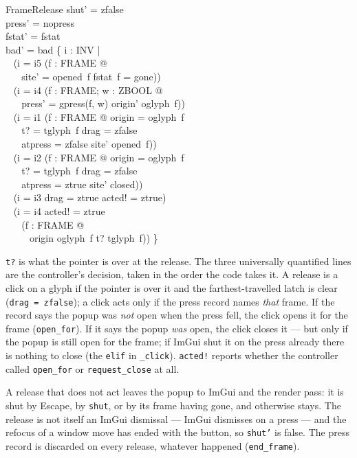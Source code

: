 \documentclass[a4paper,10pt,fleqn]{article}
\begin{document}
\begin{schema}{FrameRelease}
  shut' = zfalse \\
  press' = nopress \\
  fstat' = fstat \\
  bad' = bad \cup \{ i : INV | \\
  \quad~ (i = i5 \land (\exists f : FRAME @ \\
  \quad~ \quad~ site' = opened~f \land fstat~f = gone)) \\
  \quad~ \lor (i = i4 \land (\exists f : FRAME; w : ZBOOL @ \\
  \quad~ \quad~ press' = gpress(f, w) \land origin' \neq oglyph~f)) \\
  \quad~ \lor (i = i1 \land (\exists f : FRAME @ origin = oglyph~f \\
  \quad~ \quad~ \land t? = tglyph~f \land drag = zfalse \\
  \quad~ \quad~ \land atpress = zfalse \land site' \neq opened~f)) \\
  \quad~ \lor (i = i2 \land (\exists f : FRAME @ origin = oglyph~f \\
  \quad~ \quad~ \land t? = tglyph~f \land drag = zfalse \\
  \quad~ \quad~ \land atpress = ztrue \land site' \neq closed)) \\
  \quad~ \lor (i = i3 \land drag = ztrue \land acted! = ztrue) \\
  \quad~ \lor (i = i4 \land acted! = ztrue \\
  \quad~ \quad~ \land (\forall f : FRAME @ \\
  \quad~ \quad~ \quad~ origin \neq oglyph~f \lor t? \neq tglyph~f)) \}
\end{schema}

\texttt{t?} is what the pointer is over at the release.  The three universally
quantified lines are the controller's decision, taken in the order the code
takes it.  A release is a click on a glyph if the pointer is over it and the
farthest-travelled latch is clear (\texttt{drag~=~zfalse}); a click acts only
if the press record names \emph{that} frame.  If the record says the popup was
\emph{not} open when the press fell, the click opens it for the frame
(\texttt{open\_for}).  If it says the popup \emph{was} open, the click closes
it --- but only if the popup is still open for the frame; if ImGui shut it on
the press already there is nothing to close (the \texttt{elif} in
\texttt{\_click}).  \texttt{acted!} reports whether the controller called
\texttt{open\_for} or \texttt{request\_close} at all.

A release that does not act leaves the popup to ImGui and the render pass: it
is shut by Escape, by \texttt{shut}, or by its frame having gone, and otherwise
stays.  The release is not itself an ImGui dismissal --- ImGui dismisses on a
press --- and the refocus of a window move has ended with the button, so
\texttt{shut'} is false.  The press record is discarded on every release,
whatever happened (\texttt{end\_frame}).
\end{document}
